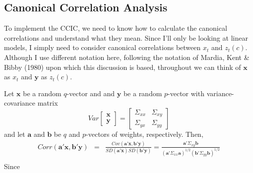 \documentclass[12pt]{article}
\theoremstyle{definition}
\begin{document}
\subsection{Canonical Correlation Analysis} 
To implement the CCIC, we need to know how to calculate the canonical correlations and understand what they mean. Since I'll only be looking at linear models, I simply need to consider canonical correlations between $x_t$ and $z_t(c)$. Although I use different notation here, following the notation of Mardia, Kent \& Bibby (1980) upon which this discussion is based, throughout we can think of $\mathbf{x}$ as $x_t$ and $\mathbf{y}$ as $z_t(c)$.


Let $\mathbf{x}$ be a random $q$-vector and and $\mathbf{y}$ be a random $p$-vector with variance-covariance matrix
  $$Var\left[\begin{array}
    {c} \textbf{x} \\ \textbf{y}
  \end{array}\right] = \left[ \begin{array}
    {cc} \Sigma_{xx} & \Sigma_{xy}\\
    \Sigma_{yx} & \Sigma_{yy}
  \end{array}\right]$$
and let $\mathbf{a}$ and $\mathbf{b}$ be $q$ and $p$-vectors of weights, respectively. Then,
\begin{eqnarray*}
  Corr(\textbf{a}'\textbf{x}, \textbf{b}'\textbf{y}) &=& \frac{Cov(\textbf{a}'\textbf{x}, \textbf{b}'\textbf{y})}{SD(\textbf{a}'\textbf{x})SD(\textbf{b}'\textbf{y})} = \frac{\mathbf{a}'\Sigma_{xy}\mathbf{b}}{\left(\mathbf{a}'\Sigma_{xx}\mathbf{a} \right)^{1/2}\left(\mathbf{b}'\Sigma_{yy}\mathbf{b} \right)^{1/2}}\\
\end{eqnarray*}
Since
\end{document}
